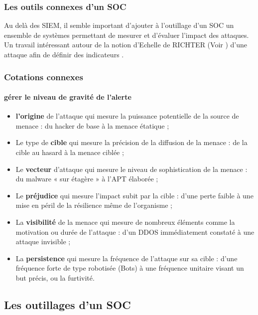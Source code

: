 \subsubsection{Les outils connexes d'un SOC}

Au delà des SIEM, il semble important d'ajouter à l'outillage d'un SOC un ensemble de systèmes permettant de mesurer et d'évaluer l'impact des attaques. Un travail intéressant autour de la notion d'Echelle de RICHTER (Voir  ) d'une attaque afin de définir des indicateurs .

\begin{frame}
\frametitle<presentation>{Cotations connexes	}
\framesubtitle<presentation>{gérer le niveau de gravité de l'alerte}
\begin{itemize}
  \item \textbf{l’origine} de l’attaque qui mesure la puissance potentielle de la source de menace : du hacker de base à la menace étatique ;
  \item Le type de \textbf{cible} qui mesure la précision de la diffusion de la menace : de la cible au hasard à la menace ciblée ;
  \item Le \textbf{vecteur} d’attaque qui mesure le niveau de sophistication de la menace : du malware « sur étagère » à l’APT élaborée ;
   \item Le \textbf{préjudice} qui mesure l’impact subit par la cible : d’une perte faible à une mise en péril de la résilience même de l’organisme ;
  \item La \textbf{visibilité} de la menace qui mesure de nombreux éléments comme la motivation ou durée de l’attaque : d’un DDOS immédiatement constaté à une attaque invisible ;
  \item La \textbf{persistence} qui mesure la fréquence de l’attaque sur sa cible : d’une fréquence forte de type robotisée (Bots) à  une fréquence unitaire visant un but précis, ou la furtivité.
\end{itemize}
\end{frame}

\subsection{Les outillages d'un SOC}

